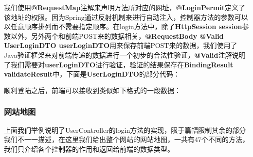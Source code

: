 

我们使用\textbf{@RequestMap}注解来声明方法所对应的网址，\textbf{@LoginPermit}定义了该地址的权限。因为Spring通过反射机制来进行自动注入，控制器方法的参数可以以任意顺序排列而不需要指定顺序。在login方法中，除了\textbf{HttpSession session}参数以外，另外两个和前端POST来的数据相关，\textbf{@RequestBody @Valid UserLoginDTO userLoginDTO}用来保存前端POST来的数据，我们使用了Java验证框架来对前端传递的数据进行一个初步的合法性验证，\textbf{@Valid}注解说明了我们需要对\textbf{userLoginDTO}进行验证，验证的结果保存在\textbf{BindingResult validateResult}中，下面是\textbf{UserLoginDTO}的部分代码：



顺利登陆之后，前端可以接收到类似如下格式的一段数据：



\subsubsection{网站地图}
上面我们举例说明了UserController的login方法的实现，限于篇幅限制其余的部分我们不一一描述，在这里我们给出整个网站的网站地图，一共有47个不同的方法，我们只介绍各个控制器的作用和返回给前端的数据类型。

